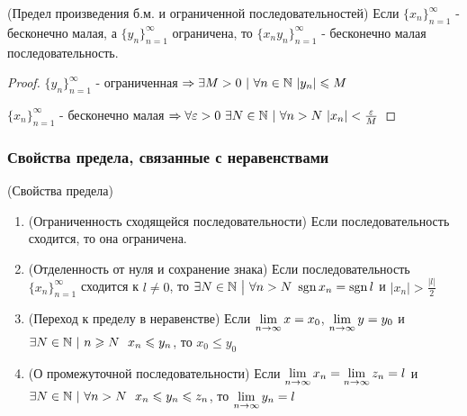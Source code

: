 \begin{theorem} (Предел произведения б.м. и ограниченной последовательностей)
	Если $\{x_n\}_{n = 1}^\infty$ - бесконечно малая, а $\{y_n\}_{n = 1}^\infty$ ограничена, то $\{x_ny_n\}_{n = 1}^\infty$ - бесконечно малая последовательность.
\end{theorem}
\begin{proof}
	$\{y_n\}_{n = 1}^\infty$ - ограниченная $\Ra \exists M > 0\ |\ \forall n \in \N\ |y_n| \le M$
	
	$\{x_n\}_{n = 1}^\infty$ - бесконечно малая $\Ra \forall \eps > 0\ \exists N \in \N\ |\ \forall n > N\ |x_n| < \frac{\eps}{M}$
\end{proof}


\subsubsection{Свойства предела, связанные с неравенствами}
\begin{theorem}(Свойства предела) 

	\begin{enumerate}
		\item (Ограниченность сходящейся последовательности) Если последовательность сходится, то она ограничена.
		
		\item (Отделенность от нуля и сохранение знака) Если последовательность $\{x_n\}_{n = 1}^\infty$ сходится к $l \neq 0$, то $\exists N \in \N \such \forall n > N\ \sgn x_n = \sgn l$ и $|x_n| > \frac{|l|}{2}$
		
		\item (Переход к пределу в неравенстве) Если $\lim\limits_{n \to \infty} x = x_0$, $\lim\limits_{n \to \infty} y = y_0$ и $\exists N \in \mathbb{N}\ |\ n \geqslant N\ \ x_n \leqslant y_n$, то $x_0 \le y_0$
		
		\item (О промежуточной последовательности) Если $\lim\limits_{n \to \infty} x_n = \lim\limits_{n \to \infty} z_n = l$ и $\exists N \in \mathbb{N}\ |\ \forall n > N\ \ x_n \leqslant y_n \leqslant z_n$, то $\lim\limits_{n \to \infty} y_n = l$
	\end{enumerate}
\end{theorem}

